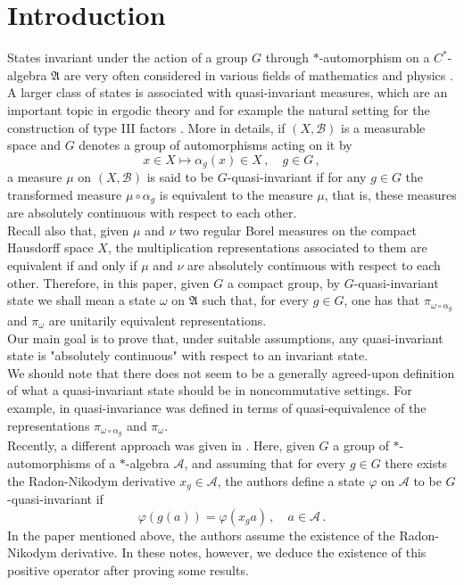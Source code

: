 \documentclass[12pt]{amsart}
\numberwithin{equation}{section}
\def\ca{{\mathcal A}}
\def\cb{{\mathcal B}}
\def\ga{{\mathfrak A}} \def\gpa{{\mathfrak a}}
\def\a{\alpha}
\def\p{\pi}
\def\f{\varphi} \def\ff{\phi} \def\F{\Phi}
\def\om{\omega} \def\Om{\Omega}
\theoremstyle{definition}
\begin{document}
\section{Introduction}
 States invariant under the action of a group $G$ through $*$-automorphism on a $C^*$-algebra $\ga$ are very often considered in various fields of mathematics and physics \cite{BR1, Sakai}.
A larger class of states is associated with quasi-invariant measures, which are an important topic in ergodic theory and for example the natural setting for the construction of type III factors \cite{Wal,T2}. More in details, if $(X,\cb)$ is a measurable space and $G$ 
denotes a group of automorphisms acting on it by
$$
x\in X  \mapsto \a_g(x)\in X\,,\quad g\in G\,,
$$
a measure  $\mu$ on  $(X,\cb)$ is said to be $G$-quasi-invariant if for any  $g \in G$ the transformed measure  $\mu \circ \a_g$ is equivalent to the measure  $\mu$, that is, these measures are absolutely continuous with respect to each other. \\
Recall also that, given $\mu$ and $\nu$ two regular Borel measures on the compact Hausdorff space $X$, the multiplication representations associated to them are equivalent if and only if $\mu$ and $\nu$ are absolutely continuous with respect to each other. Therefore, in this paper, given $G$ a compact group, by $G$-quasi-invariant state we shall mean a state $\om$ on $\ga$ such that, for every $g\in G$, one has
that $\p_{\om\circ\a_g}$ and $\pi_\om$ are unitarily equivalent representations.\\
Our main goal is to prove that, under suitable assumptions, any quasi-invariant state is "absolutely continuous" with respect to an invariant state.\\
We should note that there does not seem to be a generally agreed-upon definition of what a quasi-invariant state should be in noncommutative settings. For example, in \cite{HKK} quasi-invariance was defined in terms of quasi-equivalence of the representations $\p_{\om\circ\a_g}$ and $\pi_\om$.\\
Recently, a different approach was given in \cite{AD}. Here, given $G$ a group of $*$-automorphisms of a $*$-algebra $\ca$, and assuming that for every $g\in G$ there exists the Radon-Nikodym derivative $x_g\in\ca$,  the authors define a state $\f$ on $\ca$ to be $G$-quasi-invariant if 
\begin{equation}
\label{eq:AccDha}
\f(g(a))=\f(x_ga)\,, \quad a\in \ca\,. 
\end{equation}
In the paper mentioned above, the authors assume the existence of the Radon-Nikodym derivative. In these notes, however, we deduce the existence of this positive operator after proving some results.  \\ 
\end{document}
